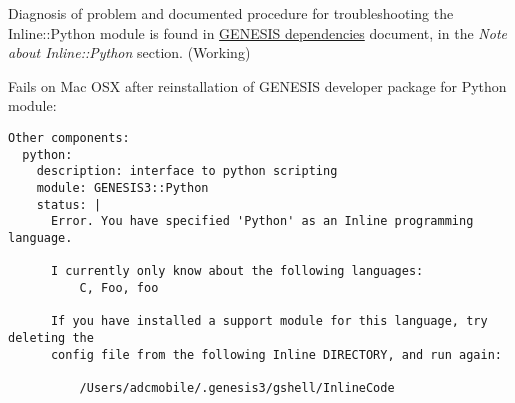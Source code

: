\documentclass[12pt]{article}
\begin{document}
Diagnosis of problem and documented procedure for troubleshooting the Inline::Python module is found in \href{../genesis-dependencies/genesis-dependencies.tex}{GENESIS dependencies} document, in the {\it Note about Inline::Python} section. (Working)

Fails on Mac OSX after reinstallation of GENESIS developer package for Python module:
\begin{verbatim}
Other components:
  python:
    description: interface to python scripting
    module: GENESIS3::Python
    status: |
      Error. You have specified 'Python' as an Inline programming language.
      
      I currently only know about the following languages:
          C, Foo, foo
      
      If you have installed a support module for this language, try deleting the
      config file from the following Inline DIRECTORY, and run again:
      
          /Users/adcmobile/.genesis3/gshell/InlineCode
      

\end{verbatim}
\end{document}
